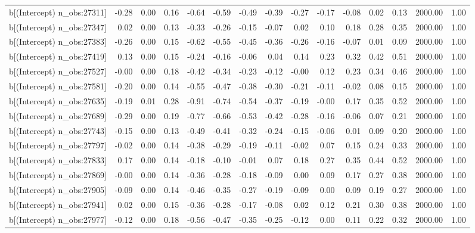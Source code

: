 \begin{table}[ht]
\begin{tabular}{rrrrrrrrrrrrrrr}
  b[(Intercept) n\_obs:27311] & -0.28 & 0.00 & 0.16 & -0.64 & -0.59 & -0.49 & -0.39 & -0.27 & -0.17 & -0.08 & 0.02 & 0.13 & 2000.00 & 1.00 \\ 
  b[(Intercept) n\_obs:27347] & 0.02 & 0.00 & 0.13 & -0.33 & -0.26 & -0.15 & -0.07 & 0.02 & 0.10 & 0.18 & 0.28 & 0.35 & 2000.00 & 1.00 \\ 
  b[(Intercept) n\_obs:27383] & -0.26 & 0.00 & 0.15 & -0.62 & -0.55 & -0.45 & -0.36 & -0.26 & -0.16 & -0.07 & 0.01 & 0.09 & 2000.00 & 1.00 \\ 
  b[(Intercept) n\_obs:27419] & 0.13 & 0.00 & 0.15 & -0.24 & -0.16 & -0.06 & 0.04 & 0.14 & 0.23 & 0.32 & 0.42 & 0.51 & 2000.00 & 1.00 \\ 
  b[(Intercept) n\_obs:27527] & -0.00 & 0.00 & 0.18 & -0.42 & -0.34 & -0.23 & -0.12 & -0.00 & 0.12 & 0.23 & 0.34 & 0.46 & 2000.00 & 1.00 \\ 
  b[(Intercept) n\_obs:27581] & -0.20 & 0.00 & 0.14 & -0.55 & -0.47 & -0.38 & -0.30 & -0.21 & -0.11 & -0.02 & 0.08 & 0.15 & 2000.00 & 1.00 \\ 
  b[(Intercept) n\_obs:27635] & -0.19 & 0.01 & 0.28 & -0.91 & -0.74 & -0.54 & -0.37 & -0.19 & -0.00 & 0.17 & 0.35 & 0.52 & 2000.00 & 1.00 \\ 
  b[(Intercept) n\_obs:27689] & -0.29 & 0.00 & 0.19 & -0.77 & -0.66 & -0.53 & -0.42 & -0.28 & -0.16 & -0.06 & 0.07 & 0.21 & 2000.00 & 1.00 \\ 
  b[(Intercept) n\_obs:27743] & -0.15 & 0.00 & 0.13 & -0.49 & -0.41 & -0.32 & -0.24 & -0.15 & -0.06 & 0.01 & 0.09 & 0.20 & 2000.00 & 1.00 \\ 
  b[(Intercept) n\_obs:27797] & -0.02 & 0.00 & 0.14 & -0.38 & -0.29 & -0.19 & -0.11 & -0.02 & 0.07 & 0.15 & 0.24 & 0.33 & 2000.00 & 1.00 \\ 
  b[(Intercept) n\_obs:27833] & 0.17 & 0.00 & 0.14 & -0.18 & -0.10 & -0.01 & 0.07 & 0.18 & 0.27 & 0.35 & 0.44 & 0.52 & 2000.00 & 1.00 \\ 
  b[(Intercept) n\_obs:27869] & -0.00 & 0.00 & 0.14 & -0.36 & -0.28 & -0.18 & -0.09 & 0.00 & 0.09 & 0.17 & 0.27 & 0.38 & 2000.00 & 1.00 \\ 
  b[(Intercept) n\_obs:27905] & -0.09 & 0.00 & 0.14 & -0.46 & -0.35 & -0.27 & -0.19 & -0.09 & 0.00 & 0.09 & 0.19 & 0.27 & 2000.00 & 1.00 \\ 
  b[(Intercept) n\_obs:27941] & 0.02 & 0.00 & 0.15 & -0.36 & -0.28 & -0.17 & -0.08 & 0.02 & 0.12 & 0.21 & 0.30 & 0.38 & 2000.00 & 1.00 \\ 
  b[(Intercept) n\_obs:27977] & -0.12 & 0.00 & 0.18 & -0.56 & -0.47 & -0.35 & -0.25 & -0.12 & 0.00 & 0.11 & 0.22 & 0.32 & 2000.00 & 1.00 \\ 

\end{tabular}
\end{table}
